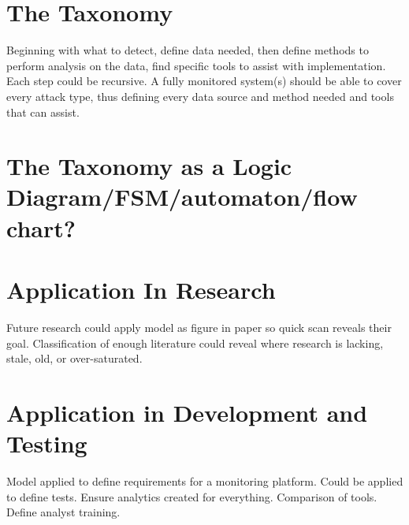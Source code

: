 \documentclass[conference]{IEEEtran}
\begin{document}
\section{The Taxonomy}
Beginning with what to detect, define data needed, then define methods to perform analysis on the data, find specific tools to assist with implementation. Each step could be recursive. A fully monitored system(s) should be able to cover every attack type, thus defining every data source and method needed and tools that can assist. 
\section{The Taxonomy as a Logic Diagram/FSM/automaton/flow chart?}
\section{Application In Research}
Future research could apply model as figure in paper so quick scan reveals their goal. Classification of enough literature could reveal where research is lacking, stale, old, or over-saturated. 
\section{Application in Development and Testing}
Model applied to define requirements for a monitoring platform. Could be applied to define tests. Ensure analytics created for everything. Comparison of tools. Define analyst training.
\end{document}
